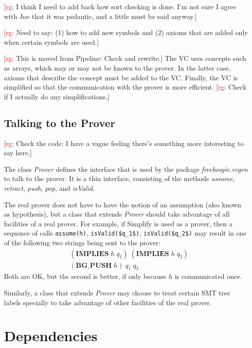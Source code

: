 \documentclass{llncs}
\newcommand{\jmlCode}{\lstinline[style=jml,basicstyle=\normalsize]}
\newcommand{\rg}[1]{{\small [\textcolor{red}{rg}: #1]}}
\begin{document}
\rg{I think I need to add back how sort checking is done. I'm not sure I
agree with Joe that it was pedantic, and a little must be said anyway.}

\rg{Need to say: (1) how to add new symbols and (2) axioms that are added
only when certain symbols are used.}

\rg{This is moved from Pipeline: Check and rewrite.}
The VC uses concepts such as arrays, which may or may not be
known to the prover. In the latter case, axioms that describe
the concept must be added to the VC\null. Finally, the VC is
simplified so that the communication with the prover is
more efficient. \rg{Check if I actually do any simplifications.}


\subsection{Talking to the Prover} %

\rg{Check the code: I have a vague feeling there's something more
interesting to say here.}

The class \textit{Prover} defines the interface that is used
by the package \textit{freeboogie.vcgen} to talk to the
prover. It is a thin interface, consisting of the methods
\textit{assume}, \textit{retract}, \textit{push}, \textit{pop},
and \textit{isValid}.

The real prover does not have to have the notion of an
assumption (also known as hypothesis), but a class that extends
\textit{Prover} should take advantage of all facilities of a real
prover. For example, if Simplify is used as a prover, then a
sequence of calls \jmlCode|assume(h)|, \jmlCode|isValid($q_1$)|,
\jmlCode|isValid($q_2$)| may result in one of the following two
strings being sent to the prover:
\begin{align}
&(\mathbf{IMPLIES}\;h\;q_1)\;(\mathbf{IMPLIES}\;h\;q_2)\\
&(\mathbf{BG\_PUSH}\;h)\;q_1\;q_2
\end{align}
Both are OK, but the second is better, if only because
$h$ is communicated once.

Similarly, a class that extends \textit{Prover} may choose to
treat certain SMT tree labels specially to take advantage of
other facilities of the real prover.

\section{Dependencies} %
\end{document}

